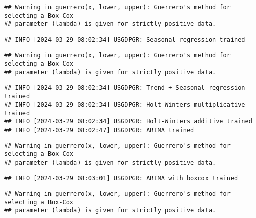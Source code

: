 \documentclass[
]{article}
\begin{document}
\begin{verbatim}
## Warning in guerrero(x, lower, upper): Guerrero's method for selecting a Box-Cox
## parameter (lambda) is given for strictly positive data.
\end{verbatim}

\begin{verbatim}
## INFO [2024-03-29 08:02:34] USGDPGR: Seasonal regression trained
\end{verbatim}

\begin{verbatim}
## Warning in guerrero(x, lower, upper): Guerrero's method for selecting a Box-Cox
## parameter (lambda) is given for strictly positive data.
\end{verbatim}

\begin{verbatim}
## INFO [2024-03-29 08:02:34] USGDPGR: Trend + Seasonal regression trained
## INFO [2024-03-29 08:02:34] USGDPGR: Holt-Winters multiplicative trained
## INFO [2024-03-29 08:02:34] USGDPGR: Holt-Winters additive trained
## INFO [2024-03-29 08:02:47] USGDPGR: ARIMA trained
\end{verbatim}

\begin{verbatim}
## Warning in guerrero(x, lower, upper): Guerrero's method for selecting a Box-Cox
## parameter (lambda) is given for strictly positive data.
\end{verbatim}

\begin{verbatim}
## INFO [2024-03-29 08:03:01] USGDPGR: ARIMA with boxcox trained
\end{verbatim}

\begin{verbatim}
## Warning in guerrero(x, lower, upper): Guerrero's method for selecting a Box-Cox
## parameter (lambda) is given for strictly positive data.
\end{verbatim}
\end{document}
